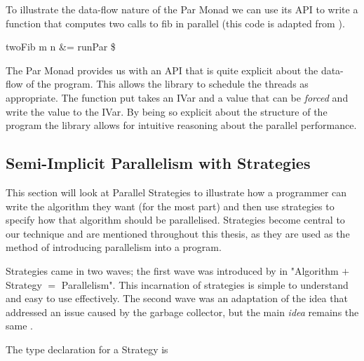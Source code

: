 To illustrate the data-flow nature of the \<Par\> Monad we can use its API to
write a function that computes two calls to \<fib\> in parallel (this code is
adapted from \citet[pg. 59]{marlowBook}).

\begin{haskell}
twoFib m n &= runPar \$ 
\end{haskell}

The \<Par\> Monad provides us with an API that is quite explicit about the
data-flow of the program. This allows the library to schedule the threads
as appropriate. The function \<put\> takes an \<IVar\> and a value that
can be \emph{forced} and write the value to the \<IVar\>. By being
so explicit about the structure of the program the library allows for
intuitive reasoning about the parallel performance.


\subsection{Semi-Implicit Parallelism with Strategies}

This section will look at Parallel Strategies to illustrate how a programmer
can write the algorithm they want (for the most part) and then use strategies
to specify how that algorithm should be parallelised. Strategies become central
to our technique and are mentioned throughout this thesis, as they are used as
the method of introducing parallelism into a program.

Strategies came in two waves; the first wave was introduced by
\citet{strategies} in "Algorithm \(+\) Strategy \(=\) Parallelism". This
incarnation of strategies is simple to understand and easy to use effectively.
The second wave was an adaptation of the idea that addressed an issue caused by
the garbage collector, but the main \emph{idea} remains the same
\citep{marlow2010seq}.

The type declaration for a Strategy is

